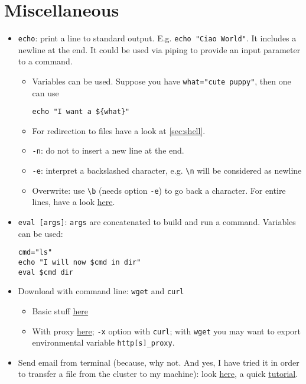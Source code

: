 \documentclass[a4paper,12pt,%
              final%
              ]{article}
\begin{document}
\section{Miscellaneous}
\label{sec:misc}
\begin{itemize}
  \item \texttt{echo}: print a line to standard output. E.g. \verb|echo "Ciao World"|. It includes a newline at the end. It could be used via piping to provide an input parameter to a command.
    \begin{itemize}
      \item Variables can be used. Suppose you have \verb|what="cute puppy"|, then one can use
\begin{verbatim}
echo "I want a ${what}"
\end{verbatim}
      \item For redirection to files have a look at \autoref{sec:shell}.
      \item \verb|-n|: do not to insert a new line at the end.
      \item \verb|-e|: interpret a backslashed character, e.g. \verb|\n| will be considered as newline
      \item Overwrite: use \verb|\b| (needs option \verb|-e|) to go back a character. For entire lines, have a look \href{https://stackoverflow.com/questions/11283625/overwrite-last-line-on-terminal}{here}.
    \end{itemize}
  \item \verb|eval [args]|: \verb|args| are concatenated to build and run a command. Variables can be used:
\begin{verbatim}
cmd="ls"
echo "I will now $cmd in dir"
eval $cmd dir
\end{verbatim}
  \item Download with command line: \texttt{wget} and \texttt{curl}
    \begin{itemize}
      \item Basic stuff \href{https://linuxconfig.org/download-file-from-url-on-linux-using-command-line}{here}
      \item With proxy \href{https://www.cyberciti.biz/faq/linux-unix-curl-command-with-proxy-username-password-http-options/}{here}; \verb|-x| option with \texttt{curl}; with \texttt{wget} you may want to export environmental variable \verb|http[s]_proxy|.
    \end{itemize}
  \item Send email from terminal (because, why not. And yes, I have tried it in order to transfer a file from the cluster to my machine): look \href{https://www.tecmint.com/send-email-attachment-from-linux-commandline/}{here}, a quick \href{https://www.interserver.net/tips/kb/linux-mail-command-usage-examples/}{tutorial}.

\end{itemize}
\end{document}

